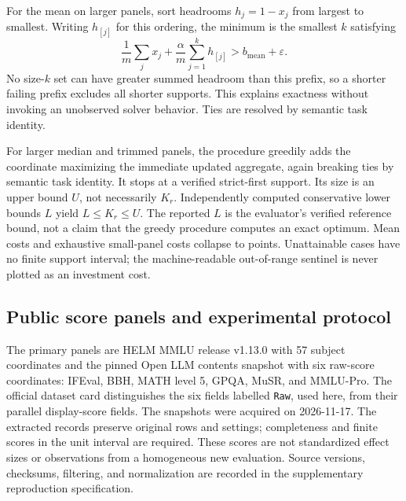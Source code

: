\documentclass{article}
\newcommand{\cost}{K}
\newcommand{\eps}{\varepsilon}
\begin{document}
For the mean on larger panels, sort headrooms $h_j=1-x_j$ from largest to smallest. Writing $h_{[j]}$ for this ordering, the minimum is the smallest $k$ satisfying
\begin{equation}
 \frac{1}{m}\sum_j x_j+\frac{\alpha}{m}\sum_{j=1}^k h_{[j]}>b_{\mathrm{mean}}+\eps.
 \label{eq:mean}
\end{equation}
No size-$k$ set can have greater summed headroom than this prefix, so a shorter failing prefix excludes all shorter supports. This explains exactness without invoking an unobserved solver behavior. Ties are resolved by semantic task identity.

For larger median and trimmed panels, the procedure greedily adds the coordinate maximizing the immediate updated aggregate, again breaking ties by semantic task identity. It stops at a verified strict-first support. Its size is an upper bound $U$, not necessarily $\cost_r$. Independently computed conservative lower bounds $L$ yield $L\le\cost_r\le U$. The reported $L$ is the evaluator's verified reference bound, not a claim that the greedy procedure computes an exact optimum. Mean costs and exhaustive small-panel costs collapse to points. Unattainable cases have no finite support interval; the machine-readable out-of-range sentinel is never plotted as an investment cost.

\subsection{Public score panels and experimental protocol}
The primary panels are HELM MMLU release v1.13.0 with 57 subject coordinates and the pinned Open LLM contents snapshot \citep{OpenLLMContents} with six raw-score coordinates: IFEval, BBH, MATH level 5, GPQA, MuSR, and MMLU-Pro. The official dataset card distinguishes the six fields labelled \texttt{Raw}, used here, from their parallel display-score fields. The snapshots were acquired on 2026-11-17. The extracted records preserve original rows and settings; completeness and finite scores in the unit interval are required. These scores are not standardized effect sizes or observations from a homogeneous new evaluation. Source versions, checksums, filtering, and normalization are recorded in the supplementary reproduction specification.
\end{document}
